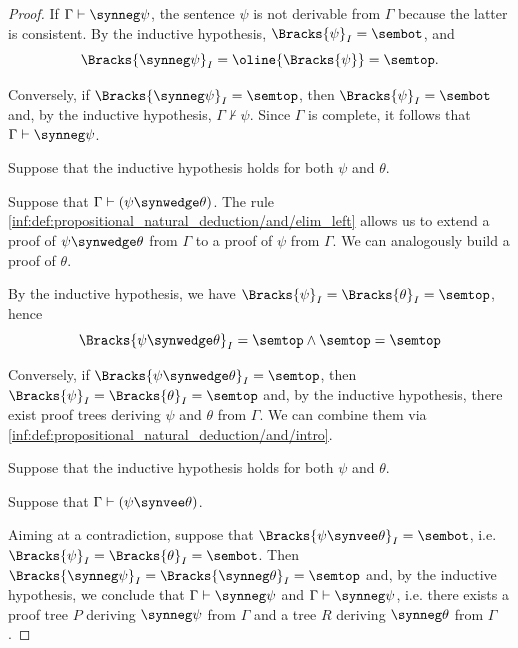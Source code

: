 \begin{proof}
  \SufficiencySubProof* If \( \Gamma \vdash \synneg \psi \), the sentence \( \psi \) is not derivable from \( \Gamma \) because the latter is consistent. By the inductive hypothesis, \( \Bracks{\psi}_I = \sembot \), and
  \begin{equation*}
    \Bracks{\synneg \psi}_I = \oline{\Bracks{\psi}} = \semtop.
  \end{equation*}

  \NecessitySubProof* Conversely, if \( \Bracks{\synneg \psi}_I = \semtop \), then \( \Bracks{\psi}_I = \sembot \) and, by the inductive hypothesis, \( \Gamma \nvdash \psi \). Since \( \Gamma \) is complete, it follows that \( \Gamma \vdash \synneg \psi \).

   Suppose that the inductive hypothesis holds for both \( \psi \) and \( \theta \).

  \SufficiencySubProof* Suppose that \( \Gamma \vdash (\psi \synwedge \theta) \). The rule \ref{inf:def:propositional_natural_deduction/and/elim_left} allows us to extend a proof of \( \psi \synwedge \theta \) from \( \Gamma \) to a proof of \( \psi \) from \( \Gamma \). We can analogously build a proof of \( \theta \).

  By the inductive hypothesis, we have \( \Bracks{\psi}_I = \Bracks{\theta}_I = \semtop \), hence
  \begin{equation*}
    \Bracks{\psi \synwedge \theta}_I
    =
    \semtop \wedge \semtop
    =
    \semtop
  \end{equation*}

  \NecessitySubProof* Conversely, if \( \Bracks{\psi \synwedge \theta}_I = \semtop \), then \( \Bracks{\psi}_I = \Bracks{\theta}_I = \semtop \) and, by the inductive hypothesis, there exist proof trees deriving \( \psi \) and \( \theta \) from \( \Gamma \). We can combine them via \ref{inf:def:propositional_natural_deduction/and/intro}.

   Suppose that the inductive hypothesis holds for both \( \psi \) and \( \theta \).

  \SufficiencySubProof* Suppose that \( \Gamma \vdash (\psi \synvee \theta) \).

  Aiming at a contradiction, suppose that \( \Bracks{\psi \synvee \theta}_I = \sembot \), i.e. \( \Bracks{\psi}_I = \Bracks{\theta}_I = \sembot \). Then \( \Bracks{\synneg \psi}_I = \Bracks{\synneg \theta}_I = \semtop \) and, by the inductive hypothesis, we conclude that \( \Gamma \vdash \synneg \psi \) and \( \Gamma \vdash \synneg \psi \), i.e. there exists a proof tree \( P \) deriving \( \synneg \psi \) from \( \Gamma \) and a tree \( R \) deriving \( \synneg \theta \) from \( \Gamma \).


\end{proof}
